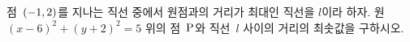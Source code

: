 점~$(-1{,}\mkern3mu\mathopen{}2)$를 지나는 직선 중에서 원점과의 거리가 최대인 직선을 $l$이라 하자. 원 $(x-6)^2+(y+2)^2=5$ 위의 점~$\mathrm{P}$와 직선~$l$ 사이의 거리의 최솟값을 구하시오.
